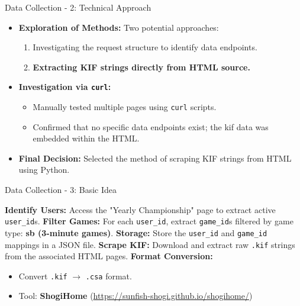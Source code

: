\documentclass[aspectratio=169]{beamer}
\begin{document}
\begin{frame}{Data Collection - 2: Technical Approach}
    \begin{itemize}
        \item \textbf{Exploration of Methods:} Two potential approaches:
            \begin{enumerate}
                \item Investigating the request structure to identify data endpoints.
                \item \textbf{Extracting KIF strings directly from HTML source.}
            \end{enumerate}
        \item \textbf{Investigation via \texttt{curl}:} 
            \begin{itemize}
                \item Manually tested multiple pages using \texttt{curl} scripts.
                \item Confirmed that no specific data endpoints exist; the kif data was embedded within the HTML.
            \end{itemize}
        \item \textbf{Final Decision:} Selected the method of scraping KIF strings from HTML using Python.
    \end{itemize}
\end{frame}

\begin{frame}{Data Collection - 3: Basic Idea}
    \begin{algorithm}[H]
        \caption{Data Extraction and Conversion Pipeline}
        \begin{algorithmic}[1]
            \STATE \textbf{Identify Users:} Access the "Yearly Championship" page to extract active \texttt{user\_id}s.
            \STATE \textbf{Filter Games:} For each \texttt{user\_id}, extract \texttt{game\_id}s filtered by game type: \textbf{sb (3-minute games)}.
            \STATE \textbf{Storage:} Store the \texttt{user\_id} and \texttt{game\_id} mappings in a JSON file.
            \STATE \textbf{Scrape KIF:} Download and extract raw \texttt{.kif} strings from the associated HTML pages.
            \STATE \textbf{Format Conversion:} 
            \begin{itemize}
                \item Convert \texttt{.kif} $\rightarrow$ \texttt{.csa} format.
                \item Tool: \textbf{ShogiHome} (\url{https://sunfish-shogi.github.io/shogihome/})
            \end{itemize}
        \end{algorithmic}
    \end{algorithm}
\end{frame}
\end{document}
